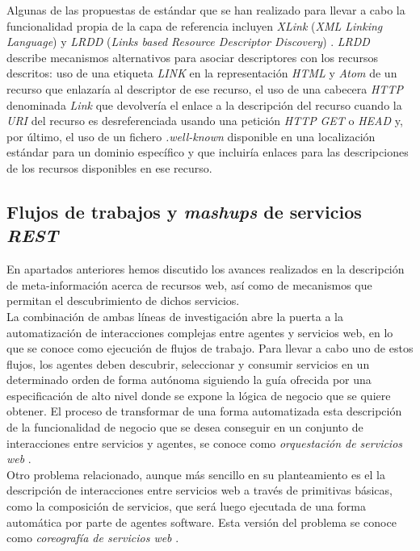 Algunas de las propuestas de est\'andar que se han realizado para llevar a cabo la funcionalidad propia de la capa de referencia incluyen \textit{XLink} (\textit{XML Linking Language})  y \textit{LRDD} (\textit{Links based Resource Descriptor Discovery}) \cite{lrdd}. \textit{LRDD} describe mecanismos alternativos para asociar descriptores con los recursos descritos: uso de una etiqueta \textit{LINK} en la representaci\'on \textit{HTML} y \textit{Atom} de un recurso que enlazar\'ia al descriptor de ese recurso, el uso de una cabecera \textit{HTTP} denominada \textit{Link} que devolver\'ia el enlace a la descripci\'on del recurso cuando la \textit{URI} del recurso es desreferenciada usando una petici\'on \textit{HTTP} \textit{GET} o \textit{HEAD} y, por \'ultimo, el uso de un fichero \textit{.well-known} disponible en una localizaci\'on est\'andar para un dominio espec\'ifico y que incluir\'ia enlaces para las descripciones de los recursos disponibles en ese recurso.\\

\subsection{Flujos de trabajos y \textit{mashups} de servicios \textit{REST}}

En apartados anteriores hemos discutido los avances realizados en la descripci\'on de meta-informaci\'on acerca de recursos web, as\'i como de mecanismos que permitan el descubrimiento de dichos servicios. \\
La combinaci\'on de ambas l\'ineas de investigaci\'on abre la puerta a la automatizaci\'on de interacciones complejas entre agentes y servicios web, en lo que se conoce como ejecuci\'on de flujos de trabajo. Para llevar a cabo uno de estos flujos, los agentes deben descubrir, seleccionar y consumir servicios en un determinado orden de forma aut\'onoma siguiendo la gu\'ia ofrecida por una especificaci\'on de alto nivel donde se expone la l\'ogica de negocio que se quiere obtener. El proceso de transformar de una forma automatizada esta descripci\'on de la funcionalidad de negocio que se desea conseguir en un conjunto de interacciones entre servicios y agentes, se conoce como \textit{orquestaci\'on de servicios web} \cite{orchestration_choreography}.\\

Otro problema relacionado, aunque m\'as sencillo en su planteamiento es el la descripci\'on de interacciones entre servicios web a trav\'es de primitivas b\'asicas, como la composici\'on de servicios, que ser\'a luego ejecutada de una forma autom\'atica por parte de agentes software. Esta versi\'on del problema se conoce como \textit{coreograf\'ia de servicios web} \cite{orchestration_choreography}.\\

